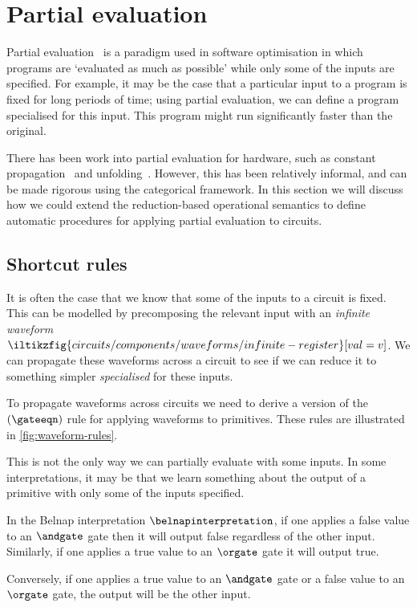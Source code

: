 \section{Partial evaluation}\label{sec:partial}

Partial evaluation~\cite{jones1996introduction} is a paradigm used in software
optimisation in which programs are `evaluated as much as possible' while only
some of the inputs are specified.
For example, it may be the case that a particular input to a program is fixed
for long periods of time; using partial evaluation, we can define a program
specialised for this input.
This program might run significantly faster than the original.

There has been work into partial evaluation for hardware, such as constant
propagation~\cite{singh1996expressing,singh1999partial} and
unfolding~\cite{thompson2006bitlevel}.
However, this has been relatively informal, and can be made rigorous using the
categorical framework.
In this section we will discuss how we could extend the reduction-based
operational semantics to define automatic procedures for applying partial
evaluation to circuits.

\subsection{Shortcut rules}

It is often the case that we know that some of the inputs to a circuit is fixed.
This can be modelled by precomposing the relevant input with an
\emph{infinite waveform} \(
\iltikzfig{circuits/components/waveforms/infinite-register}[val=v]
\).
We can propagate these waveforms across a circuit to see if we can reduce it to
something simpler \emph{specialised} for these inputs.

To propagate waveforms across circuits we need to derive a version of the
\((\gateeqn)\) rule for applying waveforms to primitives.
These rules are illustrated in \cref{fig:waveform-rules}.



This is not the only way we can partially evaluate with some inputs.
In some interpretations, it may be that we learn something about the output of
a primitive with only some of the inputs specified.

\begin{example}
    In the Belnap interpretation \(\belnapinterpretation\), if one applies a
    false value to an \(\andgate\) gate then it will output false regardless of
    the other input.
    Similarly, if one applies a true value to an \(\orgate\) gate it will output
    true.

    Conversely, if one applies a true value to an \(\andgate\) gate or a false
    value to an \(\orgate\) gate, the output will be the other input.
\end{example}

